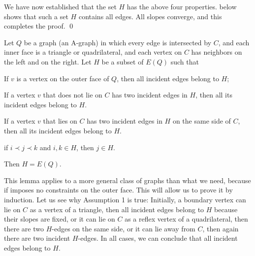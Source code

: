 We have now established that the set $H$ has
 the above four properties.
    below shows that such a set
   $H$ contains all edges. All slopes converge, and this 
   completes the proof.
\qed%


\begin{lem}
  Let $Q$ be a graph (an A-graph) in which every edge is intersected
  by $C$, and each inner face is a triangle or quadrilateral, and each
  vertex on $C$ has neighbors on the left and on the right.  Let $H$
  be a subset of $E(Q)$ such that
   \begin{compactenum}
    \item If $v$ is a vertex on the outer face 
      of $Q$, then all incident edges belong to $H$;
    \item
If a vertex $v$ that does not lie on $C$ has two incident edges in
$H$,
then all its incident edges belong to $H$.
    \item
If a vertex $v$ that lies on $C$ has two incident edges in
$H$ on the same side of $C$,
then all its incident edges belong to $H$.
    \item if $i \prec j \prec k$ and $i,k\in H$, 
      then $j\in H$.
   \end{compactenum}
   Then $H=E(Q)$.
\end{lem}

This lemma applies to a more general class of graphs than what we
need,
because if imposes no constraints on the outer face.
This will allow us to prove it by induction.
Let us see why Assumption 1 is true: Initially, a boundary vertex
 can
lie on $C$ as a vertex of a triangle, then all incident edges belong to $H$ because their slopes
are fixed,
or it
 can
lie on $C$ as a reflex vertex of a quadrilateral, then there are two
$H$-edges on the same side,
or it can
lie away from $C$, then again there are two
incident $H$-edges.
In all cases, we can conclude that all incident edges belong to $H$.


